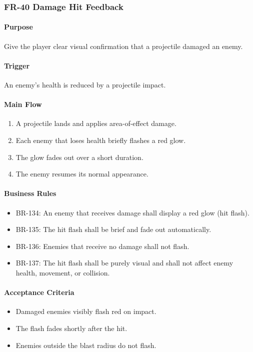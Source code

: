 \documentclass[11pt,a4paper]{article}
\begin{document}
\subsubsection{FR-40 Damage Hit Feedback}

\paragraph{Purpose}
Give the player clear visual confirmation that a projectile damaged an enemy.

\paragraph{Trigger}
An enemy's health is reduced by a projectile impact.

\paragraph{Main Flow}
\begin{enumerate}
  \item A projectile lands and applies area-of-effect damage.
  \item Each enemy that loses health briefly flashes a red glow.
  \item The glow fades out over a short duration.
  \item The enemy resumes its normal appearance.
\end{enumerate}

\paragraph{Business Rules}
\begin{itemize}
  \item BR-134: An enemy that receives damage shall display a red glow (hit flash).
  \item BR-135: The hit flash shall be brief and fade out automatically.
  \item BR-136: Enemies that receive no damage shall not flash.
  \item BR-137: The hit flash shall be purely visual and shall not affect enemy
        health, movement, or collision.
\end{itemize}

\paragraph{Acceptance Criteria}
\begin{itemize}
  \item Damaged enemies visibly flash red on impact.
  \item The flash fades shortly after the hit.
  \item Enemies outside the blast radius do not flash.
\end{itemize}
\end{document}
